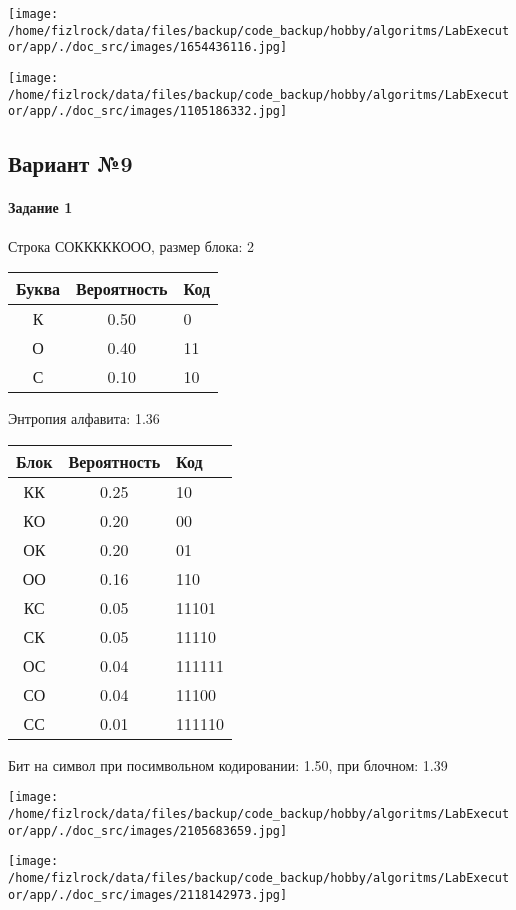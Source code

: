 \documentclass[a4paper, 12pt]{article}
\begin{document}
\texttt{[image: /home/fizlrock/data/files/backup/code\_backup/hobby/algoritms/LabExecutor/app/./doc\_src/images/1654436116.jpg]}

\texttt{[image: /home/fizlrock/data/files/backup/code\_backup/hobby/algoritms/LabExecutor/app/./doc\_src/images/1105186332.jpg]}
\pagebreak
\subsection{Вариант №9}
\paragraph{Задание 1}

Строка СОКККККООО, размер блока: 2
\begin{center}
 \begin{tabular}{ |c|c|l| } 
  \hline
     Буква & Вероятность & Код\\ \hline
К & 0.50 & 0\\\hline
О & 0.40 & 11\\\hline
С & 0.10 & 10
\\ \hline \end{tabular}
\end{center}
Энтропия алфавита: 1.36
\begin{center}
 \begin{tabular}{ |c|c|l| } 
  \hline
     Блок & Вероятность & Код\\ \hline
КК & 0.25 & 10\\\hline
КО & 0.20 & 00\\\hline
ОК & 0.20 & 01\\\hline
ОО & 0.16 & 110\\\hline
КС & 0.05 & 11101\\\hline
СК & 0.05 & 11110\\\hline
ОС & 0.04 & 111111\\\hline
СО & 0.04 & 11100\\\hline
СС & 0.01 & 111110
\\ \hline \end{tabular}
\end{center}
Бит на символ при посимвольном кодировании: 1.50, при блочном: 1.39

\texttt{[image: /home/fizlrock/data/files/backup/code\_backup/hobby/algoritms/LabExecutor/app/./doc\_src/images/2105683659.jpg]}

\texttt{[image: /home/fizlrock/data/files/backup/code\_backup/hobby/algoritms/LabExecutor/app/./doc\_src/images/2118142973.jpg]}
\pagebreak
\end{document}
